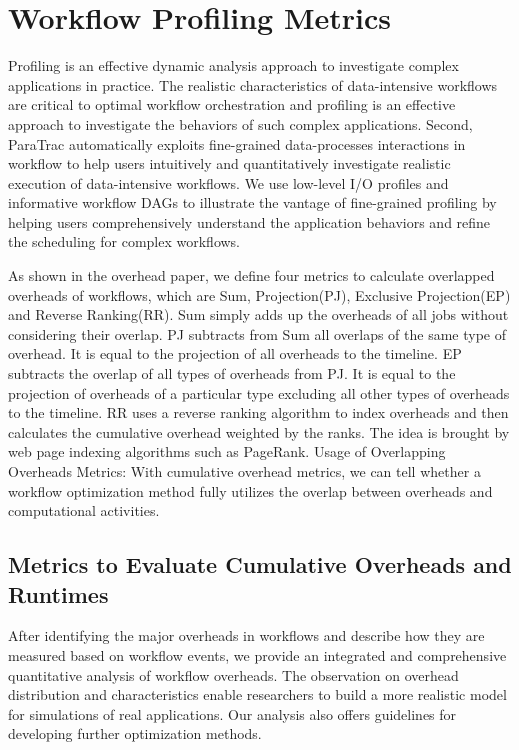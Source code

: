 
\section{Workflow Profiling Metrics}
\label{sec:profiling}

Profiling is an effective dynamic analysis approach to investigate complex applications in practice. The realistic characteristics of data-intensive workflows are critical to optimal workflow orchestration and profiling is an effective approach to investigate the behaviors of such complex applications. Second, ParaTrac automatically exploits fine-grained data-processes interactions in workflow to help users intuitively and quantitatively investigate realistic execution of data-intensive workflows. We use low-level I/O profiles and informative workflow DAGs to illustrate the vantage of fine-grained profiling by helping users comprehensively understand the application behaviors and refine the scheduling for complex workflows.

As shown in the overhead paper, we define four metrics to calculate overlapped overheads of workflows, which are Sum, Projection(PJ), Exclusive Projection(EP) and Reverse Ranking(RR). Sum simply adds up the overheads of all jobs without considering their overlap. PJ subtracts from Sum all overlaps of the same type of overhead. It is equal to the projection of all overheads to the timeline. EP subtracts the overlap of all types of overheads from PJ. It is equal to the projection of overheads of a particular type excluding all other types of overheads to the timeline. RR uses a reverse ranking algorithm to index overheads and then calculates the cumulative overhead weighted by the ranks. The idea is brought by web page indexing algorithms such as PageRank.
Usage of Overlapping Overheads Metrics:
With cumulative overhead metrics, we can tell whether a workflow optimization method fully utilizes the overlap between overheads and computational activities. 



\subsection{Metrics to Evaluate Cumulative Overheads and Runtimes}

After identifying the major overheads in workflows and describe how they are measured based on workflow events, we provide an integrated and comprehensive quantitative analysis of workflow overheads. The observation on overhead distribution and characteristics enable researchers to build a more realistic model for simulations of real applications. Our analysis also offers guidelines for developing further optimization methods. 


